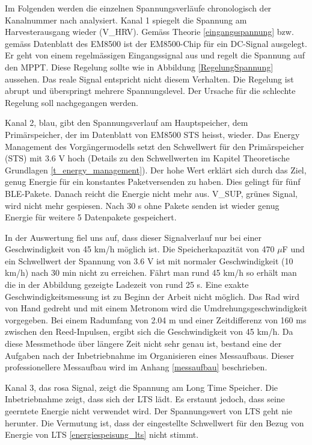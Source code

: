 Im Folgenden werden die einzelnen Spannungsverläufe chronologisch der Kanalnummer nach analysiert. Kanal 1 spiegelt die Spannung am Harvesterausgang wieder (V\_HRV). Gemäss Theorie \ref{eingangsspannung} bzw. gemäss Datenblatt des EM8500 ist der EM8500-Chip für ein DC-Signal ausgelegt. Er geht von einem regelmässigen Eingangssignal aus und regelt die Spannung auf den MPPT. Diese Regelung sollte wie in Abbildung \ref{RegelungSpannung} aussehen. Das reale Signal entspricht nicht diesem Verhalten. Die Regelung ist abrupt und überspringt mehrere Spannungslevel. Der Ursache für die schlechte Regelung soll nachgegangen werden.

Kanal 2, blau, gibt den Spannungsverlauf am Hauptspeicher, dem Primärspeicher, der im Datenblatt von EM8500 STS heisst, wieder. Das Energy Management des Vorgängermodells setzt den Schwellwert für den Primärspeicher (STS) mit 3.6 V hoch (Details zu den Schwellwerten im Kapitel Theoretische Grundlagen \ref{t_energy_management}). Der hohe Wert erklärt sich durch das Ziel, genug Energie für ein konstantes Paketversenden zu haben. Dies gelingt für fünf BLE-Pakete. Danach reicht die Energie nicht mehr aus. V\_SUP, grünes Signal, wird nicht mehr gespiesen. Nach 30 s ohne Pakete senden ist wieder genug Energie für weitere 5 Datenpakete gespeichert.

In der Auswertung fiel uns auf, dass dieser Signalverlauf nur bei einer Geschwindigkeit von 45 km/h möglich ist. Die Speicherkapazität von 470 $\mu$F und ein Schwellwert der Spannung von 3.6 V ist mit normaler Geschwindigkeit (10 km/h) nach 30 min nicht zu erreichen. Fährt man rund 45 km/h so erhält man die in der Abbildung gezeigte Ladezeit von rund 25 s. Eine exakte Geschwindigkeitsmessung ist zu Beginn der Arbeit nicht möglich. Das Rad wird von Hand gedreht und mit einem Metronom wird die Umdrehungsgeschwindigkeit vorgegeben. Bei einem Radumfang von 2.04 m und einer Zeitdifferenz von 160 ms zwischen den Reed-Inpulsen, ergibt sich die Geschwindigkeit von 45 km/h. Da diese Messmethode über längere Zeit nicht sehr genau ist, bestand eine der Aufgaben nach der Inbetriebnahme im Organisieren eines Messaufbaus. Dieser professionellere Messaufbau wird im Anhang \ref{messaufbau} beschrieben.


Kanal 3, das rosa Signal, zeigt die Spannung am Long Time Speicher. Die Inbetriebnahme zeigt, dass sich der LTS lädt. Es erstaunt jedoch, dass seine geerntete Energie nicht verwendet wird. Der Spannungswert von LTS geht nie herunter.
Die Vermutung ist, dass der eingestellte Schwellwert für den Bezug von Energie von LTS \ref{energiespeisung_lts} nicht stimmt.

